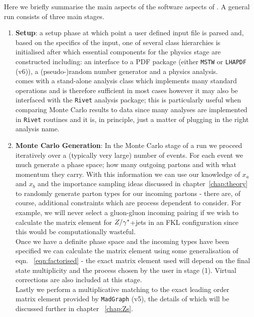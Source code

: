 		Here we briefly summarise the main aspects of the software aspects of \hej.  A general
		\HEJ run consists of three main stages.

		\begin{enumerate}
			\item \textbf{Setup}: a setup phase at which point a user defined input file is parsed
			and, based on the specifics of the input, one of several class hierarchies is
			initialised after which essential components for the physics stage are constructed including:
			an interface to a PDF package (either \texttt{MSTW} or
			\texttt{LHAPDF} (v6)), a (pseudo-)random number generator and
			a physics analysis.\\\HEJ comes with a stand-alone analysis class
			which implements many standard operations and is therefore sufficient in most
			cases however it may also be interfaced with the \texttt{Rivet} analysis package;
			this is particularly useful when comparing Monte Carlo results to data since
			many analyses are implemented in \texttt{Rivet} routines and it is, in principle,
			just a matter of plugging in the right analysis name.

			\item \textbf{Monte Carlo Generation}: In the Monte Carlo stage of a \HEJ run we
			proceed iteratively over a (typically very large) number of events.  For each
			event we much generate a phase space; how many outgoing partons and with
			what momentum they carry.  With this information we can use our knowledge of $x_a$
			and $x_b$ and the importance sampling ideas discussed in chapter~\ref{chap:theory}
			to randomly generate parton types for our incoming partons - there are, of course,
			additional constraints which are process dependent to consider.  For example, we
			will never select a gluon-gluon incoming pairing if we wish to calculate the matrix
			element for $Z/\gamma^*$+jets in an FKL configuration since this would be computationally
			wasteful.\\Once we have a definite phase space and the incoming types have been
			specified we can calculate the matrix element using some generalisation of eqn.
			~\eqref{eqn:factorised} - the exact matrix element used will depend on the
			final state multiplicity and the process chosen by the user in stage (1).  Virtual
			corrections are also included at this stage.\\Lastly we perform a
			multiplicative matching to the exact leading order matrix element provided by
			\texttt{MadGraph} (v5), the details of which will be discussed further in chapter
			~\ref{chap:Zs}.


\end{enumerate}
